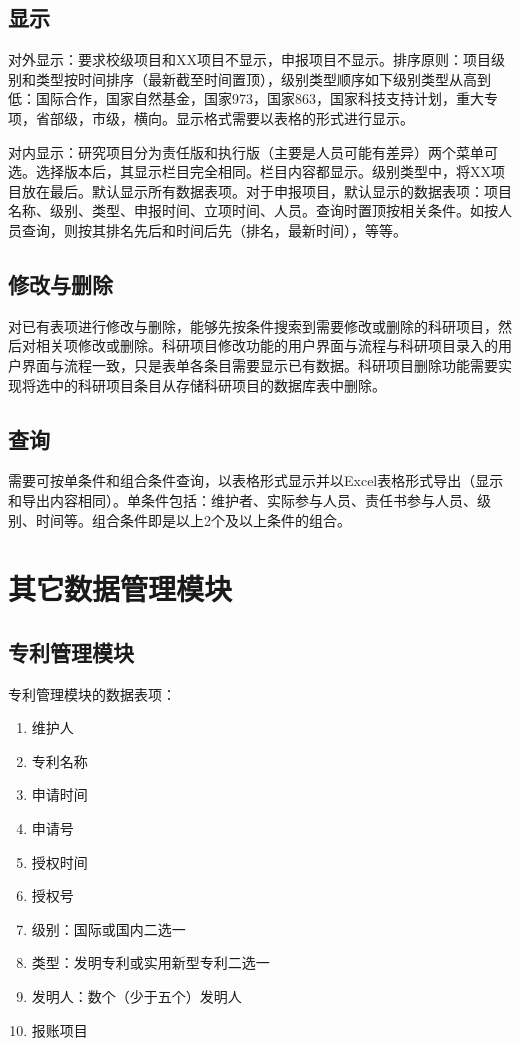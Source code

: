 \subsection{显示}
\label{projectview}
对外显示：要求校级项目和XX项目不显示，申报项目不显示。排序原则：项目级别和类型按时间排序（最新截至时间置顶），级别类型顺序如下级别类型从高到低：国际合作，国家自然基金，国家973，国家863，国家科技支持计划，重大专项，省部级，市级，横向。显示格式需要以表格的形式进行显示。

对内显示：研究项目分为责任版和执行版（主要是人员可能有差异）两个菜单可选。选择版本后，其显示栏目完全相同。栏目内容都显示。级别类型中，将XX项目放在最后。默认显示所有数据表项。对于申报项目，默认显示的数据表项：项目名称、级别、类型、申报时间、立项时间、人员。查询时置顶按相关条件。如按人员查询，则按其排名先后和时间后先（排名，最新时间），等等。

\subsection{修改与删除}
\label{projectupdate}
对已有表项进行修改与删除，能够先按条件搜索到需要修改或删除的科研项目，然后对相关项修改或删除。科研项目修改功能的用户界面与流程与科研项目录入的用户界面与流程一致，只是表单各条目需要显示已有数据。科研项目删除功能需要实现将选中的科研项目条目从存储科研项目的数据库表中删除。

\subsection{查询}
\label{projectsearch}
需要可按单条件和组合条件查询，以表格形式显示并以Excel表格形式导出（显示和导出内容相同）。单条件包括：维护者、实际参与人员、责任书参与人员、级别、时间等。组合条件即是以上2个及以上条件的组合。

\section{其它数据管理模块}\subsection{专利管理模块}

专利管理模块的数据表项：

\begin{enumerate}
\item 维护人
\item 专利名称
\item 申请时间
\item 申请号
\item 授权时间
\item 授权号
\item 级别：国际或国内二选一
\item 类型：发明专利或实用新型专利二选一
\item 发明人：数个（少于五个）发明人
\item 报账项目
\end{enumerate}

